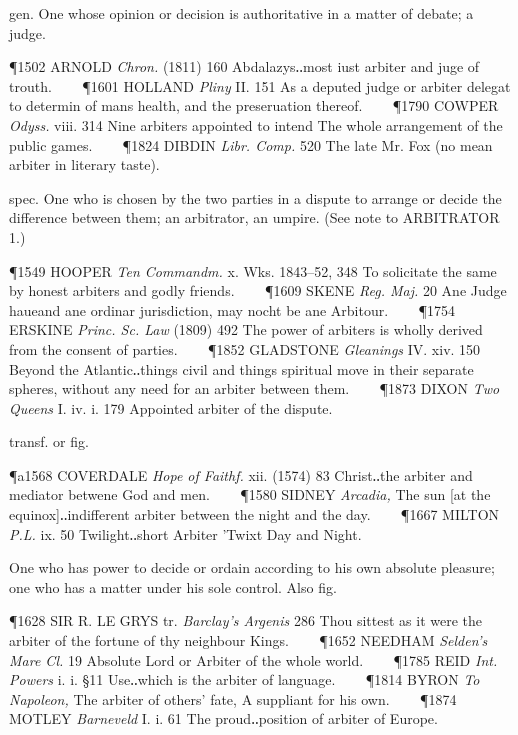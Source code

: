 \begin{description}[wide, labelwidth=!, labelindent=0pt]
\begin{myenumerate}

 gen. One whose opinion or decision is authoritative in a matter of debate; a judge.

\P 1502 ARNOLD  \textit{Chron.} (1811) 160 Abdalazys‥most iust arbiter and juge of trouth.    
\P 1601 HOLLAND  \textit{Pliny} II. 151 As a deputed judge or arbiter delegat to determin of mans health, and the preseruation thereof.    
\P 1790 COWPER  \textit{Odyss.} viii. 314 Nine arbiters appointed to intend The whole arrangement of the public games.    
\P 1824 DIBDIN  \textit{Libr. Comp.} 520 The late Mr. Fox (no mean arbiter in literary taste).

 spec. One who is chosen by the two parties in a dispute to arrange or decide the difference between them; an arbitrator, an umpire. (See note to ARBITRATOR 1.)

\P 1549 HOOPER  \textit{Ten Commandm.} x. Wks. 1843–52, 348 To solicitate the same by honest arbiters and godly friends.    
\P 1609 SKENE  \textit{Reg. Maj.} 20 Ane Judge haueand ane ordinar jurisdiction, may nocht be ane Arbitour.    
\P 1754 ERSKINE  \textit{Princ. Sc. Law} (1809) 492 The power of arbiters is wholly derived from the consent of parties.    
\P 1852 GLADSTONE  \textit{Gleanings} IV. xiv. 150 Beyond the Atlantic‥things civil and things spiritual move in their separate spheres, without any need for an arbiter between them.    
\P 1873 DIXON  \textit{Two Queens} I. iv. i. 179 Appointed arbiter of the dispute.

 transf. or fig.

\P a1568 COVERDALE  \textit{Hope of Faithf.} xii. (1574) 83 Christ‥the arbiter and mediator betwene God and men.    
\P 1580 SIDNEY  \textit{Arcadia,} The sun [at the equinox]‥indifferent arbiter between the night and the day.    
\P 1667 MILTON  \textit{P.L.} ix. 50 Twilight‥short Arbiter 'Twixt Day and Night.

 One who has power to decide or ordain according to his own absolute pleasure; one who has a matter under his sole control. Also fig.

\P 1628 SIR R. LE GRYS tr. \textit{Barclay's Argenis} 286 Thou sittest as it were the arbiter of the fortune of thy neighbour Kings.    
\P 1652 NEEDHAM  \textit{Selden's Mare Cl.} 19 Absolute Lord or Arbiter of the whole world.    
\P 1785 REID  \textit{Int. Powers} i. i. §11 Use‥which is the arbiter of language.    
\P 1814 BYRON  \textit{To Napoleon,} The arbiter of others' fate, A suppliant for his own.    
\P 1874 MOTLEY  \textit{Barneveld} I. i. 61 The proud‥position of arbiter of Europe.


\end{myenumerate}
\end{description}

